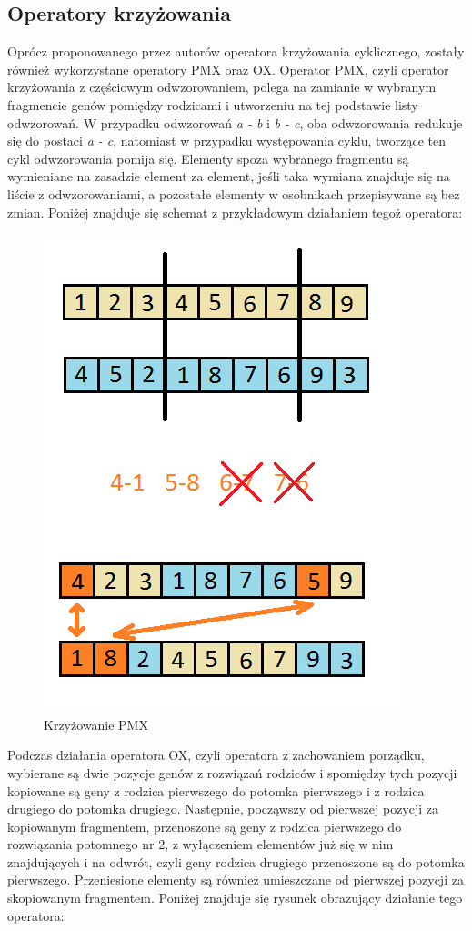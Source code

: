 \subsection{Operatory krzyżowania}
Oprócz proponowanego przez autorów operatora krzyżowania cyklicznego, zostały również wykorzystane operatory PMX oraz OX.
Operator PMX, czyli operator krzyżowania z częściowym odwzorowaniem, polega na zamianie w wybranym fragmencie genów pomiędzy rodzicami i utworzeniu na tej podstawie listy odwzorowań. W przypadku odwzorowań \textit{a - b} i \textit{b - c}, oba odwzorowania redukuje się do postaci \textit{a - c}, natomiast w przypadku występowania cyklu, tworzące ten cykl odwzorowania pomija się. Elementy spoza wybranego fragmentu są wymieniane na zasadzie element za element, jeśli taka wymiana znajduje się na liście z odwzorowaniami, a pozostałe elementy w osobnikach przepisywane są bez zmian. Poniżej znajduje się schemat z przykładowym działaniem tegoż operatora:
\begin{figure}[h]
\includegraphics[scale=1]{pmx}
\caption{Krzyżowanie PMX}
\end{figure}

Podczas działania operatora OX, czyli operatora z zachowaniem porządku, wybierane są dwie pozycje genów z rozwiązań rodziców i spomiędzy tych pozycji kopiowane są geny z rodzica pierwszego do potomka pierwszego i z rodzica drugiego do potomka drugiego. Następnie, począwszy od pierwszej pozycji za kopiowanym fragmentem, przenoszone są geny z rodzica pierwszego do rozwiązania potomnego nr 2, z wyłączeniem elementów już się w nim znajdujących i na odwrót, czyli geny rodzica drugiego przenoszone są do potomka pierwszego. Przeniesione elementy są również umieszczane od pierwszej pozycji za skopiowanym fragmentem. Poniżej znajduje się rysunek obrazujący działanie tego operatora:

